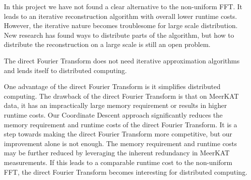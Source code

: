 In this project we have not found a clear alternative to the non-uniform FFT. It leads to an iterative reconstruction algorithm with overall lower runtime costs. However, the iterative nature becomes troublesome for large scale distribution. New research has found ways to distribute parts of the algorithm\cite{offringa2014wsclean, pratley2018fast}, but how to distribute the reconstruction on a large scale is still an open problem.


The direct Fourier Transform does not need iterative approximation algorithms and lends itself to distributed computing.  


One advantage of the direct Fourier Transform is it simplifies distributed computing. The drawback of the direct Fourier Transform is that on MeerKAT data, it has an impractically large memory requirement or results in higher runtime costs. Our Coordinate Descent approach significantly reduces the memory requirement and runtime costs of the direct Fourier Transform. It is a step towards making the direct Fourier Transform more competitive, but our improvement alone is not enough. The memory requirement and runtime costs may be further reduced by leveraging the inherent redundancy in MeerKAT measurements. If this leads to a comparable runtime cost to the non-uniform FFT, the direct Fourier Transform becomes interesting for distributed computing.










